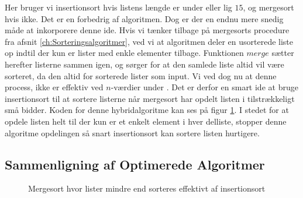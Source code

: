 Her bruger vi insertionsort hvis listens længde er under eller lig $15$, og mergesort hvis ikke. Det er en forbedrig af algoritmen. Dog er der en endnu mere snedig måde at inkorporere denne ide. Hvis vi tænker tilbage på mergesorts procedure fra afsnit \ref{ch:Sorteringsalgoritmer}, ved vi at algoritmen deler en usorterede liste op indtil der kun er lister med enkle elementer tilbage. Funktionen $merge$ sætter herefter listerne sammen igen, og sørger for at den samlede liste altid vil være sorteret, da den altid for sorterede lister som input. Vi ved dog nu at denne process, ikke er effektiv ved $n$-værdier under . Det er derfor en smart ide at bruge insertionsort til at sortere listerne når mergesort har opdelt listen i tilstrækkeligt små bidder. Koden for denne hybridalgoritme kan ses på figur \ref{fig:hybridalgoritme2}. I stedet for at opdele listen helt til der kun er et enkelt element i hver delliste, stopper denne algoritme opdelingen så snart insertionsort kan sortere listen hurtigere.

\subsection{Sammenligning af Optimerede Algoritmer}%
\label{sub:Sammenligning af Optimerede Algoritmer}



\begin{figure}
	\begin{center}
		
	\end{center}
	\caption{Mergesort hvor lister mindre end  sorteres effektivt af insertionsort}
	\label{fig:hybridalgoritme2}
\end{figure}



